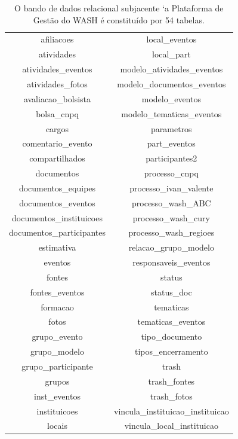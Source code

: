 \documentclass[
12pt,		%
openright,	%
twoside,  %
a4paper,			%
chapter=TITLE,		%
english,			%
french,				%
spanish,			%
brazil				%
]{USPSC-classe/USPSC}
\begin{document}
\begin{table}[htb]
\tiny
\caption{\label{5b2e4ba8f3836249e7dd88b37344da7bfa3669c5}O bando de dados relacional subjacente `a Plataforma de Gest\~ao do WASH \'e constitu\'{i}do por 54 tabelas.}

\centering
\begin{tabular}{|c|c|}
\hline
afiliacoes                     &   local\_eventos \\
 atividades                     &   local\_part \\
 atividades\_eventos             &   modelo\_atividades\_eventos \\
 atividades\_fotos               &   modelo\_documentos\_eventos \\
 avaliacao\_bolsista             &   modelo\_eventos \\
 bolsa\_cnpq                     &   modelo\_tematicas\_eventos \\
 cargos                         &   parametros \\
 comentario\_evento              &   part\_eventos \\
 compartilhados                 &   participantes2 \\
 documentos                     &   processo\_cnpq \\
 documentos\_equipes             &   processo\_ivan\_valente \\
 documentos\_eventos             &   processo\_wash\_ABC \\
 documentos\_instituicoes        &   processo\_wash\_cury \\
 documentos\_participantes       &   processo\_wash\_regioes \\
 estimativa                     &   relacao\_grupo\_modelo \\
 eventos                        &   responsaveis\_eventos \\
 fontes                         &   status \\
 fontes\_eventos                 &   status\_doc \\
 formacao                       &   tematicas \\
 fotos                          &   tematicas\_eventos \\
 grupo\_evento                   &   tipo\_documento \\
 grupo\_modelo                   &   tipos\_encerramento \\
 grupo\_participante             &   trash \\
 grupos                         &   trash\_fontes \\
 inst\_eventos                   &   trash\_fotos \\
 instituicoes                   &   vincula\_instituicao\_instituicao \\
 locais                         &   vincula\_local\_instituicao \\
\hline
\end{tabular}
\end{table}
\end{document}
